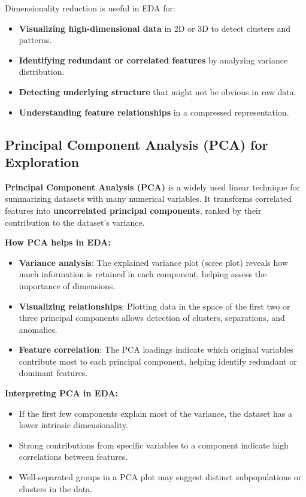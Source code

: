 \documentclass[12pt,openany]{book}
\begin{document}
Dimensionality reduction is useful in EDA for:
\begin{itemize}
    \item \textbf{Visualizing high-dimensional data} in 2D or 3D to detect clusters and patterns.
    \item \textbf{Identifying redundant or correlated features} by analyzing variance distribution.
    \item \textbf{Detecting underlying structure} that might not be obvious in raw data.
    \item \textbf{Understanding feature relationships} in a compressed representation.
\end{itemize}

\subsection{Principal Component Analysis (PCA) for Exploration}

\textbf{Principal Component Analysis (PCA)} is a widely used linear technique for summarizing datasets with many numerical variables. It transforms correlated features into \textbf{uncorrelated principal components}, ranked by their contribution to the dataset’s variance.

\textbf{How PCA helps in EDA:}
\begin{itemize}
    \item \textbf{Variance analysis}: The explained variance plot (scree plot) reveals how much information is retained in each component, helping assess the importance of dimensions.
    \item \textbf{Visualizing relationships}: Plotting data in the space of the first two or three principal components allows detection of clusters, separations, and anomalies.
    \item \textbf{Feature correlation}: The PCA loadings indicate which original variables contribute most to each principal component, helping identify redundant or dominant features.
\end{itemize}

\textbf{Interpreting PCA in EDA:}
\begin{itemize}
    \item If the first few components explain most of the variance, the dataset has a lower intrinsic dimensionality.
    \item Strong contributions from specific variables to a component indicate high correlations between features.
    \item Well-separated groups in a PCA plot may suggest distinct subpopulations or clusters in the data.
\end{itemize}
\end{document}
